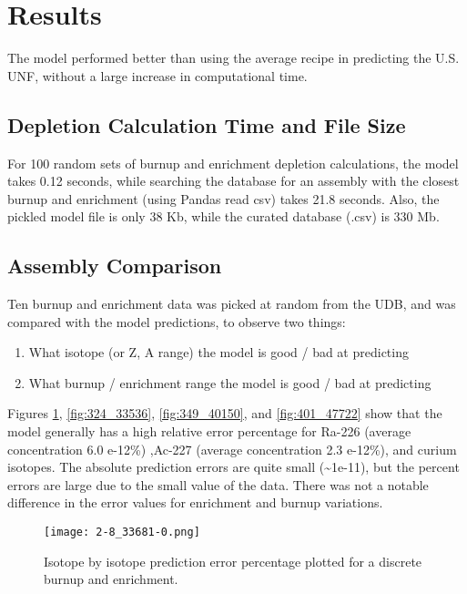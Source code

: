 \section{Results}

The model performed better than using the average
recipe in predicting the U.S. \gls{UNF}, without
a large increase in computational time.


\subsection{Depletion Calculation Time and File Size}

For 100 random sets of
burnup and enrichment depletion calculations,
the model takes 0.12 seconds, while
searching the database for an assembly
with the closest burnup and enrichment (using Pandas read csv)
takes 21.8 seconds. Also, the pickled model file is only
38 Kb, while the curated database (.csv) is 330 Mb.

\subsection{Assembly Comparison}

Ten burnup and enrichment data was picked at random from the \gls{UDB},
and was compared with the model predictions, to observe
two things:
\begin{enumerate}
    \item What isotope (or Z, A range) the model is good / bad
        at predicting
    \item What burnup / enrichment range the model is good / bad
        at predicting
\end{enumerate}

Figures \ref{fig:28_33681}, \ref{fig:324_33536},
\ref{fig:349_40150}, and \ref{fig:401_47722}
show that the model
generally has a high relative error percentage for Ra-226
(average concentration 6.0 e-12\%) ,Ac-227 (average concentration  2.3 e-12\%), and curium isotopes.
The absolute prediction errors are quite small
(\textasciitilde 1e-11), but the percent errors are large due
to the small value of the data. There was not a notable
difference in the error values for enrichment
and burnup variations.

\begin{figure}
    \centering
    \texttt{[image: 2-8\_33681-0.png]}
    \caption{Isotope by isotope prediction error percentage
             plotted for a discrete burnup and enrichment.}
    \label{fig:28_33681}
\end{figure}


